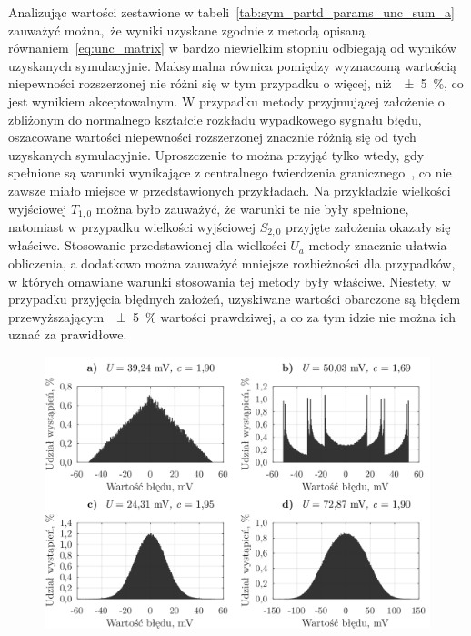 Analizując wartości zestawione w tabeli~\ref{tab:sym_partd_params_unc_sum_a} zauważyć można, że wyniki uzyskane zgodnie z metodą opisaną równaniem~\eqref{eq:unc_matrix} w bardzo niewielkim stopniu odbiegają od wyników uzyskanych symulacyjnie. Maksymalna równica pomiędzy wyznaczoną wartością niepewności rozszerzonej nie różni się w tym przypadku o więcej, niż~\qty{\pm 5}{\percent}, co jest wynikiem akceptowalnym. W przypadku metody przyjmującej założenie o zbliżonym do normalnego kształcie rozkładu wypadkowego sygnału błędu, oszacowane wartości niepewności rozszerzonej znacznie różnią się od tych uzyskanych symulacyjnie. Uproszczenie to można przyjąć tylko wtedy, gdy spełnione są warunki wynikające z centralnego twierdzenia granicznego~\cite{jcgm_guide}, co nie zawsze miało miejsce w przedstawionych przykładach. Na przykładzie wielkości wyjściowej $T_{1,0}$ można było zauważyć, że warunki te nie były spełnione, natomiast w przypadku wielkości wyjściowej $S_{2,0}$ przyjęte założenia okazały się właściwe. Stosowanie przedstawionej dla wielkości $U_{a}$ metody znacznie ułatwia obliczenia, a dodatkowo można zauważyć mniejsze rozbieżności dla przypadków, w których omawiane warunki stosowania tej metody były właściwe. Niestety, w przypadku przyjęcia błędnych założeń, uzyskiwane wartości obarczone są błędem przewyższającym~\qty{\pm 5}{\percent} wartości prawdziwej, a co za tym idzie nie można ich uznać za prawidłowe.

\begin{figure}[htb!]
\begin{center}
\includegraphics{obrazki/hist_part_S}
\end{center}
\end{figure}

